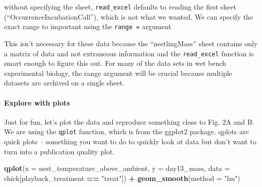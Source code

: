 \documentclass[]{book}
\newenvironment{Shaded}{\begin{snugshade}}{\end{snugshade}}
\newcommand{\CommentTok}[1]{\textcolor[rgb]{0.56,0.35,0.01}{\textit{#1}}}
\newcommand{\DataTypeTok}[1]{\textcolor[rgb]{0.13,0.29,0.53}{#1}}
\newcommand{\KeywordTok}[1]{\textcolor[rgb]{0.13,0.29,0.53}{\textbf{#1}}}
\newcommand{\NormalTok}[1]{#1}
\newcommand{\OperatorTok}[1]{\textcolor[rgb]{0.81,0.36,0.00}{\textbf{#1}}}
\newcommand{\StringTok}[1]{\textcolor[rgb]{0.31,0.60,0.02}{#1}}
\let\oldparagraph\paragraph
\renewcommand{\paragraph}[1]{\oldparagraph{#1}\mbox{}}
\begin{document}
without specifying the sheet, \texttt{read\_excel} defaults to reading the first sheet (``OccurrenceIncubationCall''), which is not what we wanted. We can specify the exact range to important using the \texttt{range\ =} argument

\begin{Shaded}
\end{Shaded}

This isn't necessary for these data because the ``nestlingMass'' sheet contains only a matrix of data and not extraneous information and the \texttt{read\_excel} function is smart enough to figure this out. For many of the data sets in wet bench experimental biology, the range argument will be crucial because multiple datasets are archived on a single sheet.

\hypertarget{explore-with-plots}{%
\paragraph{Explore with plots}\label{explore-with-plots}}

Just for fun, let's plot the data and reproduce something close to Fig. 2A and B. We are using the \texttt{qplot} function, which is from the ggplot2 package. qplots are quick plots -- something you want to do to quickly look at data but don't want to turn into a publication quality plot.

\begin{Shaded}
\begin{Highlighting}[]
\KeywordTok{qplot}\NormalTok{(}\DataTypeTok{x =}\NormalTok{ nest_temperature_above_ambient,}
      \DataTypeTok{y =}\NormalTok{ day13_mass,}
      \DataTypeTok{data =}\NormalTok{ chick[playback_treatment }\OperatorTok{==}\StringTok{ "treat"}\NormalTok{]) }\OperatorTok{+}
\StringTok{  }\KeywordTok{geom_smooth}\NormalTok{(}\DataTypeTok{method =} \StringTok{"lm"}\NormalTok{)}
\end{Highlighting}
\end{Shaded}
\end{document}
